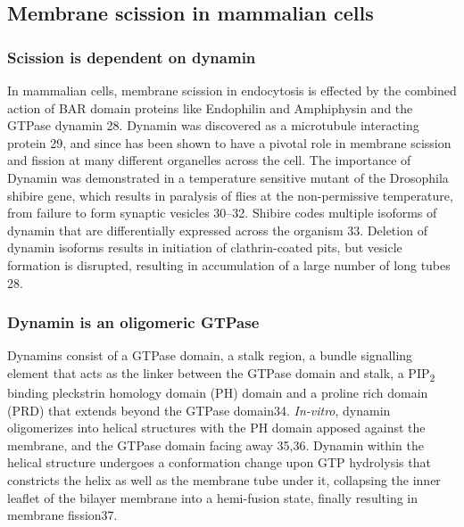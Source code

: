 		
\subsection{Membrane scission in mammalian cells}
		\subsubsection{Scission is dependent on dynamin} 
		In mammalian cells, membrane scission in endocytosis is effected by the combined action of BAR domain proteins like Endophilin and Amphiphysin and the GTPase dynamin 28.  Dynamin was discovered as a microtubule interacting protein 29, and since has been shown to have a pivotal role in membrane scission and fission at many different organelles across the cell. The importance of Dynamin was demonstrated in a temperature sensitive mutant of the Drosophila shibire gene, which results in paralysis of flies at the non-permissive temperature, from failure to form synaptic vesicles 30–32. Shibire codes multiple isoforms of dynamin that are differentially expressed across the organism 33. Deletion of dynamin isoforms results in initiation of clathrin-coated pits, but vesicle formation is disrupted, resulting in accumulation of a large number of long tubes 28. 

		 
		\subsubsection{Dynamin is an oligomeric GTPase}
		Dynamins consist of a GTPase domain, a stalk region, a bundle signalling element that acts as the linker between the GTPase domain and stalk, a PIP\textsubscript{2} binding pleckstrin homology domain (PH) domain and a proline rich domain (PRD) that extends beyond the GTPase domain34. \textit{In-vitro}, dynamin oligomerizes into helical structures with the PH domain apposed against the membrane, and the GTPase domain facing away 35,36. Dynamin within the helical structure undergoes a conformation change upon GTP hydrolysis that constricts the helix as well as the membrane tube under it, collapsing the inner leaflet of the bilayer membrane into a hemi-fusion state, finally resulting in membrane fission37.


